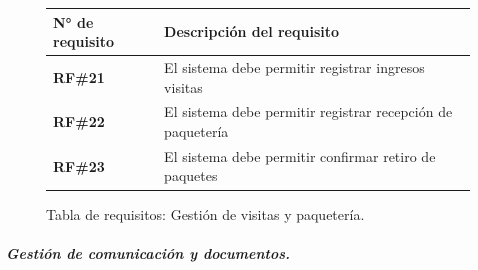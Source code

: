 \begin{figure}[H]
    \centering
    \begin{tabular}{|l|p{11cm}|}
    \hline
            \textbf{N° de requisito} 
        
        & 

            \textbf{Descripción del requisito} 
        
    \\ \hline
    
            \textbf{RF\#21} 
        
        & 

            El sistema debe permitir registrar ingresos visitas 
        
    \\ \hline
    
            \textbf{RF\#22} 
        
        & 

            El sistema debe permitir registrar recepción de paquetería 
        
    \\ \hline
    
            \textbf{RF\#23} 
        
        & 

            El sistema debe permitir confirmar retiro de paquetes 
        
    \\ \hline
    \end{tabular}
    \caption{Tabla de requisitos: Gestión de visitas y paquetería.}
\end{figure}

\subparagraph{Gestión de comunicación y documentos.}

